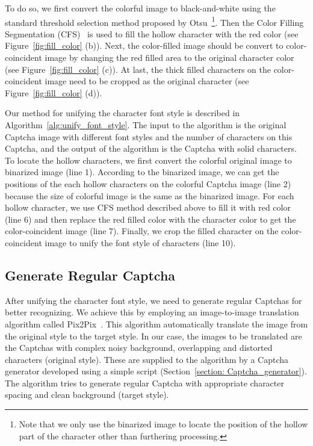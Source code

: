 To do so, we first convert the colorful image to black-and-white using the standard threshold selection method proposed by Otsu~\cite{Ostu1979A}\footnote{Note that we only use the binarized image to locate the position of the hollow part of the character other than furthering processing.}.
Then the Color Filling Segmentation (CFS)~\cite{Yan2008A} is used to fill the hollow character with the red color (see Figure~\ref{fig:fill_color} (b)). Next, the color-filled image should be convert to color-coincident image by changing the red filled area to the original character color (see Figure~\ref{fig:fill_color} (c)). At last, the thick filled characters on the color-coincident image need to be cropped as the original character (see Figure~\ref{fig:fill_color} (d)).

Our method for unifying the character font style is described in Algorithm~\ref{alg:unify_font_style}.
The input to the algorithm is the original Captcha image with different font styles and the number of characters on this Captcha, and the output of the algorithm is the Captcha with solid characters. To locate the hollow characters, we first convert the colorful original image to binarized image (line 1). According to the binarized image, we can get the positions of the each hollow characters on the colorful Captcha image (line 2) because the size of colorful image is the same as the binarized image. For each hollow character, we use CFS method described above to fill it with red color (line 6) and then replace the red filled color with the character color to get the color-coincident image (line 7). Finally, we crop the filled character on the color-coincident image to unify the font style of characters (line 10).

\subsection{Generate Regular Captcha}
After unifying the character font style, we need to generate regular Captchas for better recognizing. We achieve this by employing an image-to-image translation algorithm called Pix2Pix~\cite{Pix2PixCode}. This algorithm automatically translate the image from the original style to the target style. In our case, the images to be translated are the Captchas with complex noisy background, overlapping and distorted characters (original style). These are supplied to the algorithm by a Captcha generator developed using a simple script (Section~\ref{section: Captcha_generator}). The algorithm tries to generate regular Captcha with appropriate character spacing and clean background (target style).

